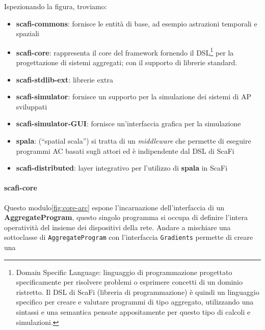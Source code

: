 \documentclass[12pt,a4paper,openright,twoside]{book}
\begin{document}
Ispezionando la figura, troviamo:

\begin{itemize}
    \item \textbf{scafi-commons}: fornisce le entità di base, ad esempio astrazioni temporali e spaziali
    \item \textbf{scafi-core}: rappresenta il core del framework fornendo il DSL\footnote{Domain Specific Language: linguaggio di programmazione progettato specificamente per risolvere problemi o esprimere concetti di un dominio ristretto. Il DSL di ScaFi (libreria di programmazione) è quindi un linguaggio specifico per creare e valutare programmi di tipo aggregato, utilizzando una sintassi e una semantica pensate appositamente per questo tipo di calcoli e simulazioni.} per la progettazione di sistemi aggregati; con il supporto di librerie standard.
    \item \textbf{scafi-stdlib-ext}: librerie extra
    \item \textbf{scafi-simulator}: fornisce un supporto per la simulazione dei sistemi di \ac{AP} sviluppati
    \item \textbf{scafi-simulator-GUI}: fornisce un'interfaccia grafica per la simulazione
    \item \textbf{spala}: (``spatial scala'') si tratta di un \textit{middleware} che permette di eseguire programmi \ac{AC} basati sugli attori ed è indipendente dal DSL di ScaFi
    \item \textbf{scafi-distributed}: layer integrativo per l'utilizzo di \textbf{spala} in ScaFi
\end{itemize}

\paragraph{scafi-core} Questo modulo\cref{fig:core-arc} espone l'incarnazione dell'interfaccia di un \textbf{AggregateProgram}, questo singolo programma si occupa di definire l'intera operatività del insieme dei dispositivi della rete. Andare a mischiare una sottoclasse di \verb|AggregateProgram| con l'interfaccia \verb|Gradients| permette di creare una 
\end{document}
